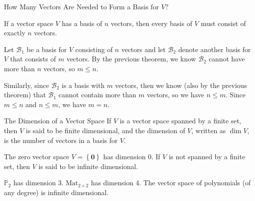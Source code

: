 \documentclass[xcolor=dvipsnames,aspectratio=169,t]{beamer}
\begin{document}
\begin{frame}{How Many Vectors Are Needed to Form a Basis for $V$?}
  \medskip
  
  \begin{theorem}
  If a vector space $V$ has a basis of $n$ vectors, then \alert{every} basis of $V$ must consist of \alert{exactly} $n$ vectors.
  \end{theorem}
  \bigskip

  \pause
  Let $\mathcal{B}_1$ be a basis for $V$ consisting of $n$ vectors and let $\mathcal{B}_2$ denote another basis for $V$ that consists of $m$ vectors. By the previous theorem, we know $\mathcal{B}_2$ cannot have more than $n$ vectors, so $m \leq n$.
  \medskip

  \pause
  Similarly, since $\mathcal{B}_2$  is a basis with $m$ vectors, then we know (also by the previous theorem) that $\mathcal{B}_1$ cannot contain more than $m$ vectors, so we have $n \leq m$. Since $m \leq n$ and $n \leq m$, we have $m=n$.
  
  \hfill\blue{\qed}
\end{frame}


\begin{frame}{The Dimension of a Vector Space}
  \bbox
  If $V$ is a vector space spanned by a finite set, then $V$ is said to be \alert{finite dimensional}, and the \alert{dimension} of $V$, written as \alert{$\dim V$}, is the number of vectors in a basis for $V$.
  \ebox

  \pause
  \bbox
  \bi 
  \ii The zero vector space  $V = \left\{ \mathbf{0} \right\}$ has dimension 0.
  \ii If $V$ is not spanned by a finite set, then $V$ is said to be \alert{infinite dimensional}.
  \ei
  \ebox

  \pause
  \begin{example}
  \bi
  \ii $\mathbb{P}_2$ has dimension 3.  %
  \ii $\mbox{Mat}_{2 \times 2}$ has dimension 4.  %
  \ii The vector space of polynomials (of any degree) is infinite dimensional.
  \ei
  \end{example}
\end{frame}
\end{document}
